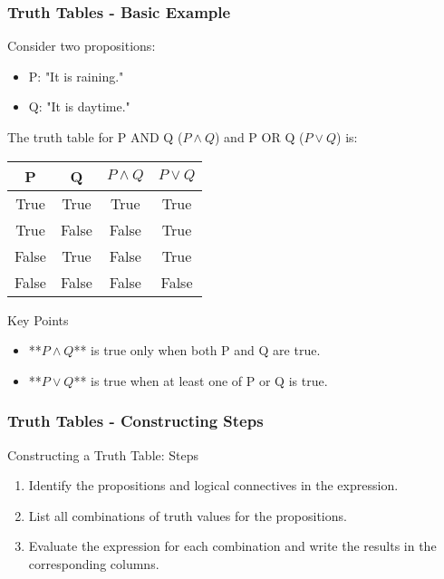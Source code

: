 \documentclass[aspectratio=169]{beamer}
\begin{document}
\begin{frame}[fragile]
    \frametitle{Truth Tables - Basic Example}
    Consider two propositions:  
    \begin{itemize}
        \item P: "It is raining."  
        \item Q: "It is daytime."
    \end{itemize}

    The truth table for P AND Q ($P \land Q$) and P OR Q ($P \lor Q$) is:

    \begin{center}
        \begin{tabular}{|c|c|c|c|}
            \hline
            P     & Q     & $P \land Q$ & $P \lor Q$ \\
            \hline
            True  & True  & True  & True  \\
            True  & False & False & True  \\
            False & True  & False & True  \\
            False & False & False & False \\
            \hline
        \end{tabular}
    \end{center}
    
    \begin{block}{Key Points}
        \begin{itemize}
            \item **$P \land Q$** is true only when both P and Q are true.
            \item **$P \lor Q$** is true when at least one of P or Q is true.
        \end{itemize}
    \end{block}
\end{frame}

\begin{frame}[fragile]
    \frametitle{Truth Tables - Constructing Steps}
    \begin{block}{Constructing a Truth Table: Steps}
        \begin{enumerate}
            \item Identify the propositions and logical connectives in the expression.
            \item List all combinations of truth values for the propositions.
            \item Evaluate the expression for each combination and write the results in the corresponding columns.
        \end{enumerate}
    \end{block}
\end{frame}
\end{document}
